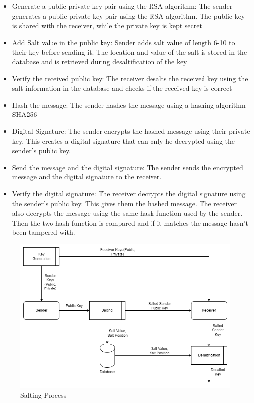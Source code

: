 \begin{itemize}
	\item Generate a public-private key pair using the RSA algorithm: The sender generates a public-private key pair using the RSA algorithm.
	      The public key is shared with the receiver, while the private key is kept secret.
	\item Add Salt value in the public key: Sender adds salt value of length 6-10 to their key before sending it.
	      The location and value of the salt is stored in the database and is retrieved during desaltification of the key
	\item Verify the received public key: The receiver desalts the received key using the salt information in the database and
	      checks if the received key is correct
	\item Hash the message: The sender hashes the message using a hashing algorithm SHA256
	\item Digital Signature: The sender encrypts the hashed message using their private key.
	      This creates a digital signature that can only he decrypted using the sender's public key.
	\item Send the message and the digital signature: The sender sends the encrypted message and the digital signature to the receiver.
	\item Verify the digital signature: The receiver decrypts the digital signature using the sender's public key.
	      This gives them the hashed message. The receiver also decrypts the message using the same hash function used by the sender.
	      Then the two hash function is compared and if it matches the message hasn't been tampered with.
\end{itemize}

\begin{figure}[H]
	\centering
	\includegraphics[width=160mm]{images/salting.png}{}
	\caption{Salting Process} %
	\label{Salting} %
\end{figure}


